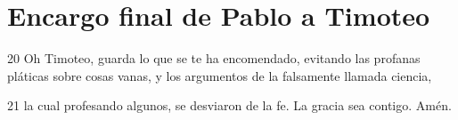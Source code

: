 \section*{Encargo final de Pablo a Timoteo}

\par 20 Oh Timoteo, guarda lo que se te ha encomendado, evitando las profanas pláticas sobre cosas vanas, y los argumentos de la falsamente llamada ciencia,
\par 21 la cual profesando algunos, se desviaron de la fe. La gracia sea contigo. Amén.

